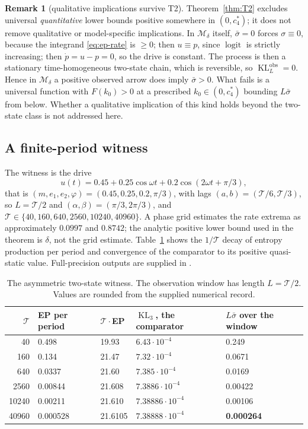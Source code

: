 \documentclass[10pt]{article}
\theoremstyle{definition}
\newtheorem{remark}[theorem]{Remark}
\DeclareMathOperator{\KL}{KL}
\newcommand{\per}{\mathcal T}
\newcommand{\sbar}{\bar\sigma}
\begin{document}
\begin{remark}[qualitative implications survive T2]
\label{rem:qualitative}
Theorem~\ref{thm:T2} excludes universal \emph{quantitative}
lower bounds positive somewhere in $(0,c_4^*)$; it does not remove qualitative or model-specific
implications.  In $\mathcal M_\delta$ itself, $\sbar=0$ forces
$\sigma\equiv0$, because the integrand \eqref{eq:ep-rate} is $\geq0$;
then $u\equiv p$, since $\operatorname{logit}$ is strictly increasing;
then $\dot p=u-p=0$, so the drive is constant.  The process is then a
stationary time-homogeneous two-state chain, which is reversible, so
$\KL^{\mathrm{obs}}_L=0$.  Hence in $\mathcal M_\delta$ a positive observed
arrow does imply $\sbar>0$. What fails is a universal function with
$F(k_0)>0$ at a prescribed $k_0\in(0,c_4^*)$ bounding $L\sbar$ from below. Whether a qualitative
implication of this kind holds beyond the two-state class is not
addressed here.
\end{remark}

\subsection{A finite-period witness}
\label{sec:witness}

The witness is the drive
\begin{equation}
\label{eq:witness}
u(t)=0.45+0.25\cos\omega t+0.2\cos(2\omega t+\pi/3),
\end{equation}
that is $(m,e_1,e_2,\varphi)=(0.45,0.25,0.2,\pi/3)$, with lags
$(a,b)=(\per/6,\per/3)$, so $L=\per/2$ and $(\alpha,\beta)=(\pi/3,2\pi/3)$,
and $\per\in\{40,160,640,2560,10240,40960\}$.
A phase grid estimates the rate extrema as approximately \(0.0997\)
and \(0.8742\); the analytic positive lower bound used in the theorem
is \(\delta\), not the grid estimate.
Table~\ref{tab:BA} shows the \(1/\per\) decay of entropy production
per period and convergence of the comparator to its positive
quasi-static value. Full-precision outputs are supplied in
.

\begin{table}[ht]
\centering
\caption{The asymmetric two-state witness. The observation window has
length \(L=\per/2\). Values are rounded from the supplied numerical record.}
\label{tab:BA}
\begin{tabular}{@{}rllll@{}}
\toprule
$\per$ & EP per period & $\per\cdot$EP & $\KL_3$, the comparator & $L\sbar$ over the window\\
\midrule
40 & 0.498 & 19.93 & $6.43\cdot10^{-4}$ & 0.249\\
160 & 0.134 & 21.47 & $7.32\cdot10^{-4}$ & 0.0671\\
640 & 0.0337 & 21.60 & $7.385\cdot10^{-4}$ & 0.0169\\
2560 & 0.00844 & 21.608 & $7.3886\cdot10^{-4}$ & 0.00422\\
10240 & 0.00211 & 21.610 & $7.38886\cdot10^{-4}$ & 0.00106\\
40960 & 0.000528 & 21.6105 & $7.38888\cdot10^{-4}$ & \textbf{0.000264}\\
\bottomrule
\end{tabular}
\end{table}
\end{document}
